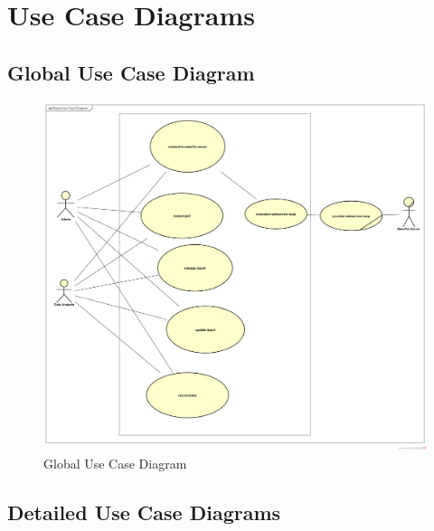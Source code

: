 	\section{Use Case Diagrams}
	\subsection{Global Use Case Diagram}
	\clearpage
	\newpage
	\begin{figure}[h]
		\centering
		\includegraphics[width=1.0\textwidth]{GlobalUseCaseDiagram.png}
		\caption{Global Use Case Diagram}
		
	\end{figure}

\clearpage
\newpage


	\subsection{Detailed Use Case Diagrams}
	\clearpage
	\newpage
